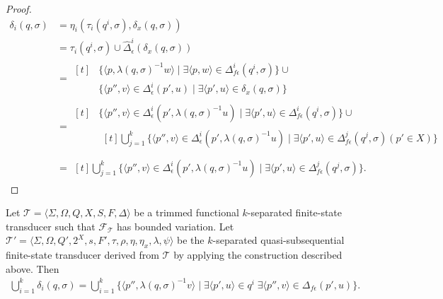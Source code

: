 \begin{proof}
  \begin{align*}
    \delta_i(q, \sigma)
    &= \eta_i(\tau_i(q^i, \sigma), \delta_x(q, \sigma))\\
    &= \tau_i(q^i, \sigma) \cup \hat{\Delta}_\epsilon^i(\delta_x(q, \sigma))\\
    &= \begin{aligned}[t]
      &\{ \langle p, \lambda(q, \sigma)^{-1}w \rangle \mid \exists \langle
      p, w \rangle \in \Delta_{f\epsilon}^i(q^i, \sigma) \} \cup\\
      &\{ \langle p'', v \rangle \in \Delta_\epsilon^i(p', u) \mid \exists \langle
      p', u \rangle \in \delta_x(q, \sigma) \}
    \end{aligned}\\
    &= \begin{aligned}[t]
      &\{ \langle p'', v \rangle \in \Delta_\epsilon^i(p', \lambda(q, \sigma)^{-1}u)
      \mid \exists \langle p', u \rangle \in \Delta_{f\epsilon}^i(q^i, \sigma) \}
      \cup\\
      &\begin{aligned}[t]
        \bigcup_{j=1}^k \{  \langle p'', v \rangle \in \Delta_\epsilon^i(p',
        \lambda(q, \sigma)^{-1}u)
	\mid \exists \langle p', u \rangle \in \Delta_{f\epsilon}^j(q^j, \sigma)
        (p' \in X) \}
      \end{aligned}
    \end{aligned}\\
    &= \begin{aligned}[t]
      \bigcup_{j=1}^k \{ \langle p'', v \rangle \in \Delta_\epsilon^i(p', \lambda(q,
      \sigma)^{-1}u) \mid \exists \langle p', u \rangle \in \Delta_{f\epsilon}^j(q^j,
      \sigma) \}.
    \end{aligned}
  \end{align*}
\end{proof}

\begin{proposition}
  Let $\mathcal{T} = \langle \Sigma, \Omega, Q, X, S, F, \Delta \rangle$ be a trimmed
  functional $k$-separated finite-state transducer such that
  $\mathcal{F}_\mathcal{T}$ has bounded variation.
  Let $\mathcal{T}' = \langle \Sigma, \Omega, Q', 2^X, s, F', \tau, \rho, \eta,
  \eta_x, \lambda, \psi \rangle$ be the $k$-separated quasi-subsequential
  finite-state transducer derived from $\mathcal{T}$ by applying the construction
  described above. Then
  \begin{align*}
    \bigcup_{i=1}^k \delta_i(q, \sigma) = \bigcup_{i=1}^k \{ \langle p'', \lambda(q,
    \sigma)^{-1}v \rangle \mid \exists \langle p', u \rangle \in q^i \; \exists
    \langle p'', v \rangle \in \Delta_{f\epsilon}(p', u) \}.
  \end{align*}
\end{proposition}

